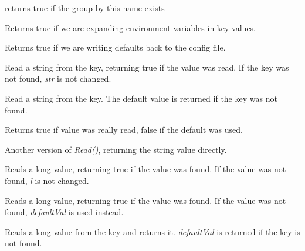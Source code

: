 
returns true if the group by this name exists


\label{wxconfigbaseisexpandingenvvars}


Returns true if we are expanding environment variables in key values.


\label{wxconfigbaseisrecordingdefaults}


Returns true if we are writing defaults back to the config file.


\label{wxconfigbaseread}


Read a string from the key, returning true if the value was read. If the key
was not found, {\it str} is not changed.


Read a string from the key. The default value is returned if the key was not
found.

Returns true if value was really read, false if the default was used.


Another version of {\it Read()}, returning the string value directly.


Reads a long value, returning true if the value was found. If the value was
not found, {\it l} is not changed.


Reads a long value, returning true if the value was found. If the value was
not found, {\it defaultVal} is used instead.


Reads a long value from the key and returns it. {\it defaultVal} is returned
if the key is not found.

